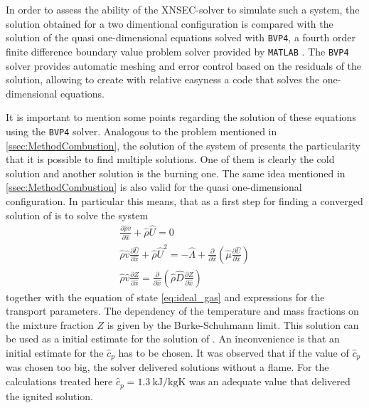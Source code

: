 In order to assess the ability of the XNSEC-solver to simulate such a system, the solution obtained for a two dimentional configuration is compared with the solution of the quasi one-dimensional equations solved with \lstinline|BVP4|, a fourth order finite difference boundary value problem solver provided by \lstinline|MATLAB| \citep{kierzenkaBVPSolverBased2001}. The \lstinline|BVP4| solver provides automatic meshing and error control based on the residuals of the solution, allowing to create with relative easyness a code that solves the one-dimensional equations.


It is important to mention some points regarding the solution of these equations using the \lstinline|BVP4| solver. Analogous to the problem mentioned in \cref{ssec:MethodCombustion}, the solution of the system of   presents the particularity that it is possible to find multiple solutions. One of them is clearly the cold solution and another solution is the burning one. The same idea mentioned in  \cref{ssec:MethodCombustion} is also valid for the quasi one-dimensional configuration. In particular this means, that as a first step for finding a converged solution of  is to solve the system
\begin{subequations}
\begin{gather}
\frac{\partial \hat \rho \hat v}{\partial \hat x} +  \hat \rho \hat U = 0\\ \label{eq:OneDimCont2}%
\hat \rho \hat v \frac{\partial \hat U}{\partial \hat x} + \hat \rho \hat U^2 =
- \hat \Lambda
+ \frac{\partial}{\partial \hat x}\left(\hat \mu \frac{\partial \hat U}{\partial \hat x}\right)\\ \label{eq:OneDimMom2}%
\hat \rho \hat v \frac{\partial Z}{\partial \hat x} = 
\frac{\partial}{\partial \hat x}\left(\hat \rho \hat D \frac{\partial Z}{\partial \hat x}\right)
\end{gather}\label{eqs:OneDimEquationsMixtureFraction}
\end{subequations}
together with the equation of state \cref{eq:ideal_gas} and expressions for the transport parameters. The dependency of the temperature and mass fractions on the mixture fraction $Z$ is given by the Burke-Schuhmann limit. This solution can be used as a initial estimate for the solution of .
An inconvenience is that an initial estimate for the $\hat c_p$ has to be chosen. It was observed that if the value of $\hat c_p$ was chosen too big, the solver delivered solutions without a flame. For the calculations treated here $\hat c_p =\SI{1.3}{\kilo \joule\per\kilogram \kelvin}$ was an adequate value that delivered the ignited solution. 

